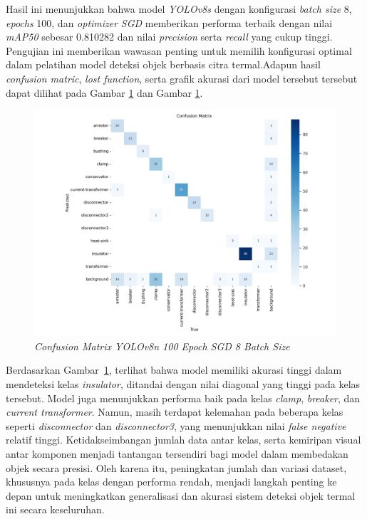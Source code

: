 Hasil ini menunjukkan bahwa model \emph{YOLOv8s} dengan konfigurasi \emph{batch
size} 8, \emph{epochs} 100, dan \emph{optimizer} \emph{SGD} memberikan performa
terbaik dengan nilai \emph{mAP50} sebesar 0.810282 dan nilai \emph{precision}
serta \emph{recall} yang cukup tinggi. Pengujian ini memberikan wawasan penting
untuk memilih konfigurasi optimal dalam pelatihan model deteksi objek berbasis
citra termal.Adapun hasil \emph{confusion matric}, \emph{lost function}, serta
grafik akurasi dari model tersebut tersebut dapat dilihat pada Gambar
\ref{fig:confusion_matrix} dan Gambar \ref{fig:confusion_matrix}.
\begin{figure}[H]
	\centering
	\includegraphics[scale=0.17]{gambar/bab4/cf_res.png}
	\caption{\emph{Confusion Matrix YOLOv8n 100 Epoch SGD 8 Batch Size}}
	\label{fig:confusion_matrix}
\end{figure}


Berdasarkan Gambar~\ref{fig:confusion_matrix}, terlihat bahwa model memiliki akurasi tinggi dalam mendeteksi kelas \emph{insulator}, ditandai dengan nilai diagonal yang tinggi pada kelas tersebut. Model juga menunjukkan performa baik pada kelas \emph{clamp}, \emph{breaker}, dan \emph{current transformer}. Namun, masih terdapat kelemahan pada beberapa kelas seperti \emph{disconnector} dan \emph{disconnector3}, yang menunjukkan nilai \emph{false negative} relatif tinggi. Ketidakseimbangan jumlah data antar kelas, serta kemiripan visual antar komponen menjadi tantangan tersendiri bagi model dalam membedakan objek secara presisi. Oleh karena itu, peningkatan jumlah dan variasi dataset, khususnya pada kelas dengan performa rendah, menjadi langkah penting ke depan untuk meningkatkan generalisasi dan akurasi sistem deteksi objek termal ini secara keseluruhan.

